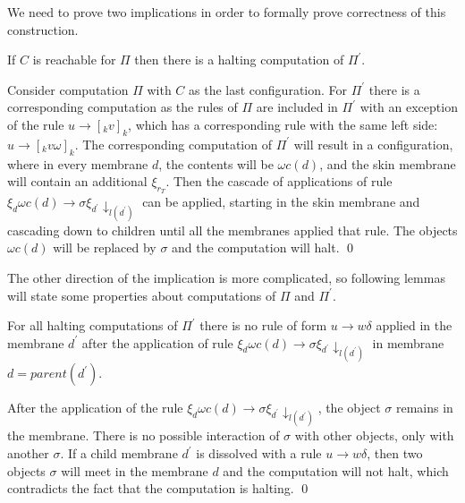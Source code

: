 We need to prove two implications in order to formally prove correctness of this construction.

\begin{lemma}
\label{if_reachable_then_halting_lemma}
  If $C$ is reachable for $\Pi$ then there is a halting computation of $\Pi^\prime$.
\end{lemma}

\begin{dokaz}
  Consider computation $\Pi$ with $C$ as the last configuration. For $\Pi^\prime$ there is a corresponding computation as the rules of $\Pi$ are included in $\Pi^\prime$ with an exception of the rule $u\rightarrow [_k v]_k$, which has a corresponding rule with the same left side: $u\rightarrow [_k v\omega]_k$. The corresponding computation of $\Pi^\prime$ will result in a configuration, where in every membrane $d$, the contents will be $\omega c(d)$, and the skin membrane will contain an additional $\xi_{r_T}$. Then the cascade of applications of rule $\xi_d\omega c(d)\rightarrow\sigma\xi_{d^\prime}\downarrow_{l(d^\prime)}$ can be applied, starting in the skin membrane and cascading down to children until all the membranes applied that rule. The objects $\omega c(d)$ will be replaced by $\sigma$ and the computation will halt. \qed
\end{dokaz}

The other direction of the implication is more complicated, so following lemmas will state some properties about computations of $\Pi$ and $\Pi^\prime$.

\begin{lemma}
\label{no_dissolving_after_check_lemma}
  For all halting computations of $\Pi^\prime$ there is no rule of form $u\rightarrow w\delta$ applied in the membrane $d^\prime$ after the application of rule $\xi_d\omega c(d)\rightarrow\sigma\xi_{d^\prime}\downarrow_{l(d^\prime)}$ in membrane $d=parent(d^\prime)$.
\end{lemma}

\begin{dokaz}
  After the application of the rule $\xi_d\omega c(d)\rightarrow\sigma\xi_{d^\prime}\downarrow_{l(d^\prime)}$, the object $\sigma$ remains in the membrane. There is no possible interaction of $\sigma$ with other objects, only with another $\sigma$. If a child membrane $d^\prime$ is dissolved with a rule $u\rightarrow w\delta$, then two objects $\sigma$ will meet in the membrane $d$ and the computation will not halt, which contradicts the fact that the computation is halting. \qed
\end{dokaz}

